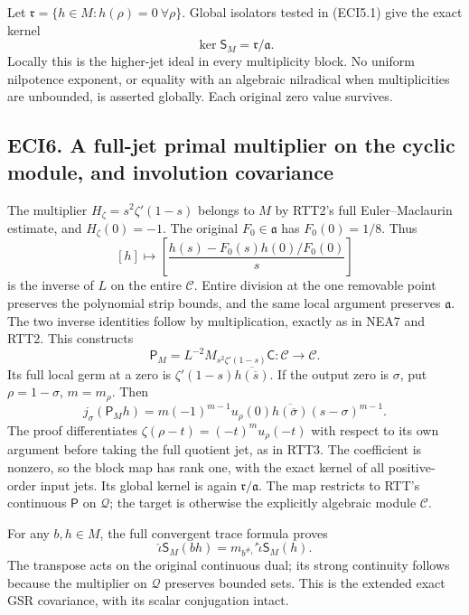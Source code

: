 Let \(\mathfrak r=\{h\in M:h(\rho)=0\ \forall\rho\}\). Global isolators
tested in (ECI5.1) give the exact kernel \[
\ker\mathsf S_M=\mathfrak r/\mathfrak a.
\tag{ECI5.7}
\] Locally this is the higher-jet ideal in every multiplicity block. No
uniform nilpotence exponent, or equality with an algebraic nilradical
when multiplicities are unbounded, is asserted globally. Each original
zero value survives.

\subsection{ECI6. A full-jet primal multiplier on the cyclic module, and
involution
covariance}\label{eci6.-a-full-jet-primal-multiplier-on-the-cyclic-module-and-involution-covariance}

The multiplier \(H_\zeta=s^2\zeta'(1-s)\) belongs to \(M\) by RTT2's
full Euler--Maclaurin estimate, and \(H_\zeta(0)=-1\). The original
\(F_0\in\mathfrak a\) has \(F_0(0)=1/8\). Thus \[
[h]\longmapsto
\left[\frac{h(s)-F_0(s)h(0)/F_0(0)}s\right]
\tag{ECI6.1}
\] is the inverse of \(L\) on the entire \(\mathscr C\). Entire division
at the one removable point preserves the polynomial strip bounds, and
the same local argument preserves \(\mathfrak a\). The two inverse
identities follow by multiplication, exactly as in NEA7 and RTT2. This
constructs \[
\mathsf P_M=L^{-2}M_{s^2\zeta'(1-s)}\mathsf C:
\mathscr C\to\mathscr C.
\tag{ECI6.2}
\] Its full local germ at a zero is
\(\zeta'(1-s)\overline{h(\overline s)}\). If the output zero is
\(\sigma\), put \(\rho=1-\sigma\), \(m=m_\rho\). Then \[
j_\sigma(\mathsf P_Mh)=
m(-1)^{m-1}u_\rho(0)\overline{h(\overline\sigma)}(s-\sigma)^{m-1}.
\tag{ECI6.3}
\] The proof differentiates \(\zeta(\rho-t)=(-t)^mu_\rho(-t)\) with
respect to its own argument before taking the full quotient jet, as in
RTT3. The coefficient is nonzero, so the block map has rank one, with
the exact kernel of all positive-order input jets. Its global kernel is
again \(\mathfrak r/\mathfrak a\). The map restricts to RTT's continuous
\(\mathsf P\) on \(\mathcal Q\); the target is otherwise the explicitly
algebraic module \(\mathscr C\).

For any \(b,h\in M\), the full convergent trace formula proves \[
\widehat\iota\mathsf S_M(bh)
=m_{b^{\#_1}}'\widehat\iota\mathsf S_M(h).
\tag{ECI6.4}
\] The transpose acts on the original continuous dual; its strong
continuity follows because the multiplier on \(\mathcal Q\) preserves
bounded sets. This is the extended exact GSR covariance, with its scalar
conjugation intact.

